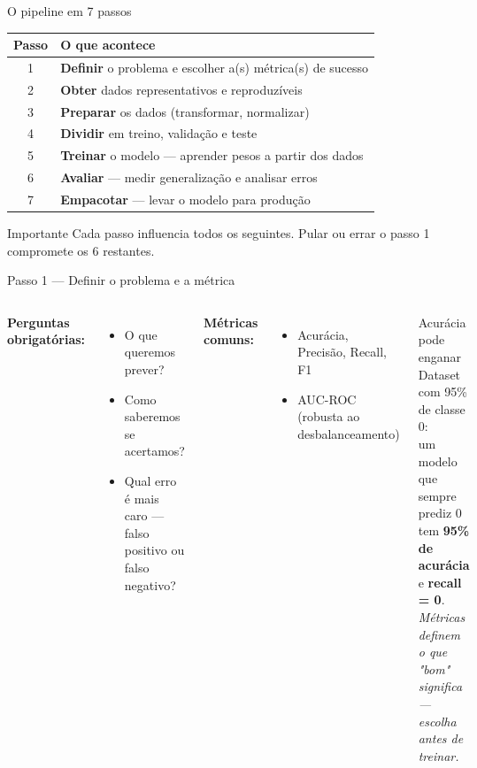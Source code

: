 \documentclass[aspectratio=169]{beamer}
\begin{document}
\begin{frame}{O pipeline em 7 passos}
\begin{center}
\begin{tabular}{cl}
  \toprule
  \textbf{Passo} & \textbf{O que acontece} \\
  \midrule
  1 & \textbf{Definir} o problema e escolher a(s) métrica(s) de sucesso \\
  2 & \textbf{Obter} dados representativos e reproduzíveis \\
  3 & \textbf{Preparar} os dados (transformar, normalizar) \\
  4 & \textbf{Dividir} em treino, validação e teste \\
  5 & \textbf{Treinar} o modelo — aprender pesos a partir dos dados \\
  6 & \textbf{Avaliar} — medir generalização e analisar erros \\
  7 & \textbf{Empacotar} — levar o modelo para produção \\
  \bottomrule
\end{tabular}
\end{center}
\vfill
\begin{alertblock}{Importante}
  Cada passo influencia todos os seguintes.
  Pular ou errar o passo 1 compromete os 6 restantes.
\end{alertblock}
\end{frame}

\begin{frame}{Passo 1 — Definir o problema e a métrica}
\begin{columns}
\textbf{Perguntas obrigatórias:}
\begin{itemize}
  \item O que queremos prever?
  \item Como saberemos se acertamos?
  \item Qual erro é mais caro — falso positivo ou falso negativo?
\end{itemize}
\vspace{6pt}
\textbf{Métricas comuns:}
\begin{itemize}
  \item Acurácia, Precisão, Recall, F1
  \item AUC-ROC (robusta ao desbalanceamento)
\end{itemize}
\begin{alertblock}{Acurácia pode enganar}
  Dataset com 95\% de classe 0:\\
  um modelo que sempre prediz 0\\
  tem \textbf{95\% de acurácia} e \textbf{recall = 0}.\\[4pt]
  \textit{Métricas definem o que "bom" significa — escolha antes de treinar.}
\end{alertblock}
\end{columns}
\end{frame}
\end{document}
